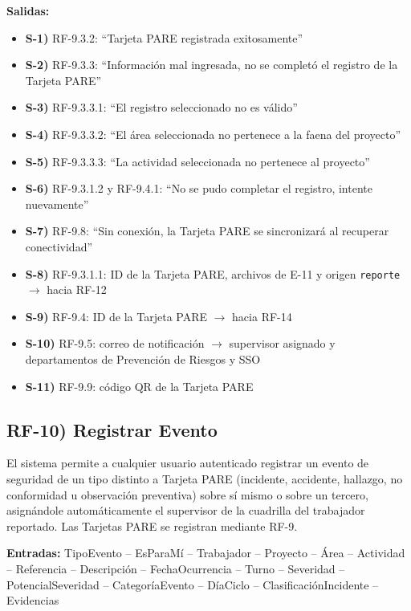 \textbf{Salidas:}
\begin{itemize}[label={}, leftmargin=1.5em]
  \item \textbf{S-1)} RF-9.3.2: ``Tarjeta PARE registrada exitosamente''
  \item \textbf{S-2)} RF-9.3.3: ``Informaci\'on mal ingresada, no se complet\'o el registro de la Tarjeta PARE''
  \item \textbf{S-3)} RF-9.3.3.1: ``El registro seleccionado no es v\'alido''
  \item \textbf{S-4)} RF-9.3.3.2: ``El \'area seleccionada no pertenece a la faena del proyecto''
  \item \textbf{S-5)} RF-9.3.3.3: ``La actividad seleccionada no pertenece al proyecto''
  \item \textbf{S-6)} RF-9.3.1.2 y RF-9.4.1: ``No se pudo completar el registro, intente nuevamente''
  \item \textbf{S-7)} RF-9.8: ``Sin conexi\'on, la Tarjeta PARE se sincronizar\'a al recuperar conectividad''
  \item \textbf{S-8)} RF-9.3.1.1: ID de la Tarjeta PARE, archivos de E-11 y origen \texttt{reporte} $\rightarrow$ hacia RF-12
  \item \textbf{S-9)} RF-9.4: ID de la Tarjeta PARE $\rightarrow$ hacia RF-14
  \item \textbf{S-10)} RF-9.5: correo de notificaci\'on $\rightarrow$ supervisor asignado y departamentos de Prevenci\'on de Riesgos y SSO
  \item \textbf{S-11)} RF-9.9: c\'odigo QR de la Tarjeta PARE
\end{itemize}

\subsection*{RF-10) Registrar Evento}
El sistema permite a cualquier usuario autenticado registrar un evento de seguridad de un tipo distinto a Tarjeta PARE (incidente, accidente, hallazgo, no conformidad u observaci\'on preventiva) sobre s\'i mismo o sobre un tercero, asign\'andole autom\'aticamente el supervisor de la cuadrilla del trabajador reportado. Las Tarjetas PARE se registran mediante RF-9.

\textbf{Entradas:} TipoEvento -- EsParaM\'i -- Trabajador -- Proyecto -- \'Area -- Actividad -- Referencia -- Descripci\'on -- FechaOcurrencia -- Turno -- Severidad -- PotencialSeveridad -- Categor\'iaEvento -- D\'iaCiclo -- Clasificaci\'onIncidente -- Evidencias

